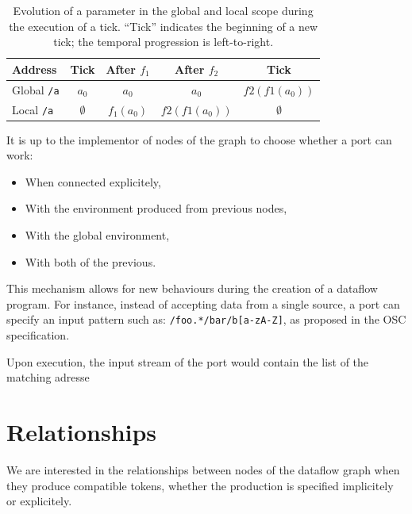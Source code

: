\documentclass{article}
\begin{document}
\begin{table}[h]
	\centering
	\footnotesize
	\begin{tabular}{l|cccc}
		Address & Tick & After $f_1$ & After $f_2$ & Tick \\
		\midrule
		Global \lstinline|/a|  & $a_0$ & $a_0$ & $a_0$ & $f2(f1(a_0))$\\
		Local \lstinline|/a|   & $\emptyset$ & $f_1(a_0)$ & $f2(f1(a_0))$ & $\emptyset$ \\	
	\end{tabular}
	\caption{Evolution of a parameter in the global and local scope during the execution of a tick. 
        ``Tick'' indicates the beginning of a new tick; the temporal progression is left-to-right.}
	\label{tbl.evolution}
\end{table}

It is up to the implementor of nodes of the graph to choose whether a port can work: 
\begin{itemize}
  \item When connected explicitely,
  \item With the environment produced from previous nodes,
  \item With the global environment,
  \item With both of the previous.
\end{itemize} 

This mechanism allows for new behaviours during the creation of a dataflow program.
For instance, instead of accepting data from a single source, a port can specify an input pattern such as: \lstinline|/foo.*/bar/b[a-zA-Z]|, as proposed in the OSC specification.

Upon execution, the input stream of the port would contain the list of the matching adresse

	
	
    
\section{Relationships}
\label{sec.relationships}
We are interested in the relationships between nodes of the dataflow graph when they produce compatible tokens, whether the production is specified implicitely or explicitely.
    
\end{document}
